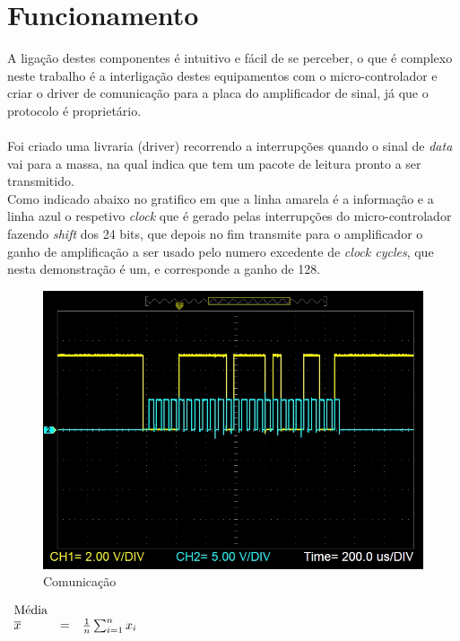 \section{Funcionamento}
A ligação destes componentes é intuitivo e fácil de se perceber, o que é complexo neste trabalho é a interligação destes equipamentos com o micro-controlador e criar o driver de comunicação para a placa do amplificador de sinal, já que o protocolo é proprietário.\\
\\
Foi criado uma livraria (driver) recorrendo a interrupções quando o sinal de \textit{data} vai para a massa, na qual indica que tem um pacote de leitura pronto a ser transmitido.\\
Como indicado abaixo no gratifico em que a linha amarela é a informação e a linha azul o respetivo \textit{clock} que é gerado pelas interrupções do micro-controlador fazendo \textit{shift} dos 24 bits, que depois no fim transmite para o amplificador o ganho de amplificação a ser usado pelo numero excedente de \textit{clock cycles}, que nesta demonstração é um, e corresponde a ganho de 128.
\begin{figure}[H]
	\centering
	\includegraphics[scale=0.65]{./image/PESTA/graph/DataClkPacket_1.JPG}
	\caption{Comunicação}
	\label{DataClkPacket_1}
\end{figure}


$\begin{array}{l l l}
	\text{Média} & & \\
	\overline{x} & = & \frac{1}{n}\sum_{i=1}^n x_i
\end{array}$

